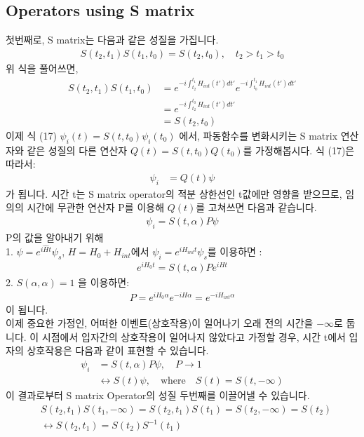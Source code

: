 \documentclass{article}
\begin{document}
\subsection*{Operators using S matrix}
첫번째로, S matrix는 다음과 같은 성질을 가집니다.
\begin{align}
   S(t_2,t_1)S(t_1,t_0)=S(t_2,t_0), \quad t_2>t_1>t_0
\end{align}
위 식을 풀어쓰면, 
\begin{align}
   S(t_2,t_1)S(t_1,t_0) &= e^{-i\int_{t_2}^{t_1}H_{int}(t')dt'}e^{-i\int_{t_0}^{t_1}H_{int}(t')dt'} \\
      & = e^{-i\int_{t_2}^{t_0}H_{int}(t')dt'}\\
      & = S(t_2,t_0)
\end{align}
이제 식 (17) $\psi_i(t) = S(t,t_0)\psi_i(t_0)$ 에서, 파동함수를 변화시키는 S matrix 연산자와 같은 성질의 다른 연산자 $Q(t)=S(t,t_0)Q(t_0)$를 가정해봅시다. 식 (17)은 따라서:
\begin{align}
   \psi_i&=Q(t)\psi
\end{align}
가 됩니다. 시간 t는 S matrix operator의 적분 상한선인 t값에만 영향을 받으므로, 임의의 시간에 무관한 연산자 P를 이용해 $Q(t)$를 고쳐쓰면 다음과 같습니다.
\begin{align}
   \psi_i=S(t,\alpha)P\psi
\end{align}
P의 값을 알아내기 위해 
\\1. $\psi=e^{i\hat{H}t}\psi_s$, $H=H_0 + H_{int}$에서 $\psi_i=e^{iH_{int}t}\psi_s$를 이용하면 :
\begin{align}
   e^{iH_0t}=S(t,\alpha)P e^{iHt}
\end{align}
2. $S(\alpha,\alpha)=1$ 을 이용하면:
\begin{align}
   P=e^{iH_0\alpha}e^{-iH\alpha}=e^{-iH_{int}\alpha}
\end{align}
이 됩니다. \\
이제 중요한 가정인, 어떠한 이벤트(상호작용)이 일어나기 오래 전의 시간을 $-\infty$로 둡니다. 이 시점에서 입자간의 상호작용이 일어나지 않았다고 가정할 경우, 시간 t에서 입자의 상호작용은 다음과 같이 표현할 수 있습니다.
\begin{align}
   \psi_i&=S(t,\alpha)P\psi,\quad P\rightarrow 1\\
      &\leftrightarrow S(t)\psi,\quad\text{where}\quad S(t)=S(t,-\infty)
\end{align}
이 결과로부터 S matrix Operator의 성질 두번째를 이끌어낼 수 있습니다.
\begin{align}
   &S(t_2,t_1)S(t_1,-\infty)=S(t_2,t_1)S(t_1)=S(t_2,-\infty) = S(t_2)\\
   &\leftrightarrow S(t_2,t_1)=S(t_2)S^{-1}(t_1)
\end{align}
\end{document}
